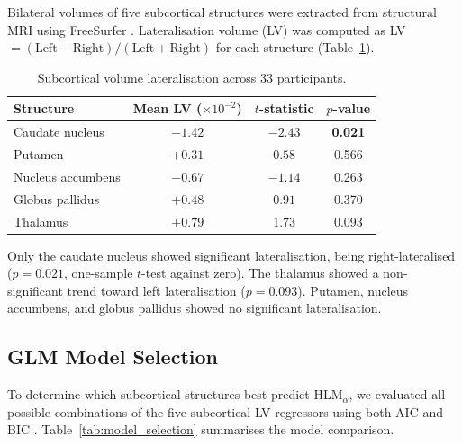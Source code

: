 \documentclass[11pt]{article}
\begin{document}
Bilateral volumes of five subcortical structures were extracted from structural MRI using FreeSurfer \citep{fischl2002whole}. Lateralisation volume (LV) was computed as LV $= (\text{Left} - \text{Right}) / (\text{Left} + \text{Right})$ for each structure (Table~\ref{tab:lateralisation}).

\begin{table}[H]
\centering
\caption{Subcortical volume lateralisation across 33 participants.}
\label{tab:lateralisation}
\begin{tabular}{@{}lccc@{}}
\toprule
Structure & Mean LV ($\times 10^{-2}$) & $t$-statistic & $p$-value \\
\midrule
Caudate nucleus & $-1.42$ & $-2.43$ & \textbf{0.021} \\
Putamen & $+0.31$ & $0.58$ & 0.566 \\
Nucleus accumbens & $-0.67$ & $-1.14$ & 0.263 \\
Globus pallidus & $+0.48$ & $0.91$ & 0.370 \\
Thalamus & $+0.79$ & $1.73$ & 0.093 \\
\bottomrule
\end{tabular}
\end{table}

Only the caudate nucleus showed significant lateralisation, being right-lateralised ($p = 0.021$, one-sample $t$-test against zero). The thalamus showed a non-significant trend toward left lateralisation ($p = 0.093$). Putamen, nucleus accumbens, and globus pallidus showed no significant lateralisation.

\subsection{GLM Model Selection}

To determine which subcortical structures best predict HLM$_\alpha$, we evaluated all possible combinations of the five subcortical LV regressors using both AIC and BIC \citep{burnham2002practical}. Table~\ref{tab:model_selection} summarises the model comparison.
\end{document}
